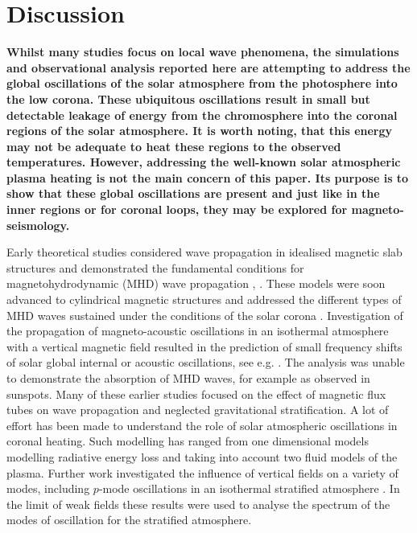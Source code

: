 \documentclass[physics,article,submit,pdftex,moreauthors]{Definitions/mdpi}
\begin{document}
\section{Discussion}
{\bf     Whilst many studies focus on local wave phenomena, the simulations and observational analysis reported here are attempting to address the global oscillations of the solar atmosphere from the photosphere into the low corona. These ubiquitous oscillations result in small but detectable leakage of energy from the chromosphere  into the coronal regions of the solar atmosphere. It is worth noting, that this energy may not be adequate to heat these regions to the observed temperatures. However, addressing the well-known  solar atmospheric plasma heating is not the main concern of this paper. Its purpose is to show that these global oscillations are present and just like in the inner regions or for coronal loops, they may be explored for magneto-seismology.}

Early theoretical studies   considered wave propagation in idealised magnetic slab structures and demonstrated the fundamental conditions for  magnetohydrodynamic (MHD) wave propagation  \cite{Roberts1981a}, \cite{Roberts1981b}. These models were soon advanced to cylindrical magnetic structures and addressed 
the different types of MHD waves sustained under the conditions of the solar corona \cite{EdwinandRoberts1983}.  Investigation of the propagation of magneto-acoustic oscillations in an isothermal atmosphere with a vertical magnetic field resulted in the prediction of small frequency shifts of solar global internal or acoustic oscillations, see e.g. \cite{Hindman1996}. The analysis was unable to demonstrate the absorption of MHD waves,  for example as observed in sunspots. Many of these  earlier studies  focused on the effect of magnetic flux tubes on wave propagation and neglected gravitational stratification. A lot of effort has been made to understand the role of solar atmospheric oscillations in coronal heating. Such modelling has ranged from one dimensional models modelling radiative energy loss  and taking into account two fluid models of the plasma. Further work investigated the influence of vertical fields on a variety of modes, including $p$-mode oscillations in an isothermal stratified atmosphere  \cite{Hasan1992}. In the limit of weak fields these results were used to analyse the spectrum of the modes of oscillation for the stratified atmosphere.
\end{document}
